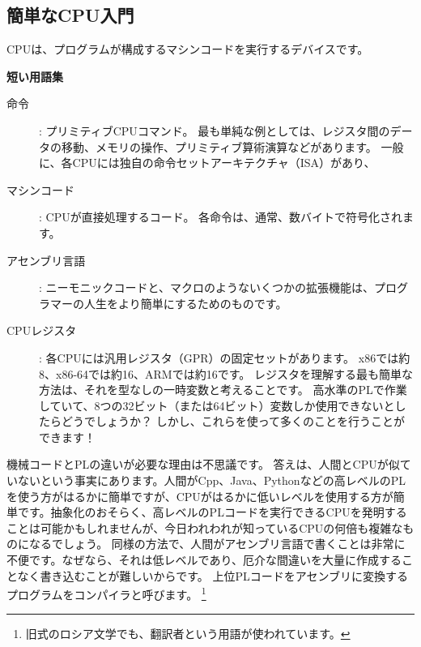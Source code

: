 \subsection{簡単なCPU入門}

\ac{CPU}は、プログラムが構成するマシンコードを実行するデバイスです。

\textbf{短い用語集}

\begin{description}
\item[命令]: プリミティブ\ac{CPU}コマンド。
最も単純な例としては、レジスタ間のデータの移動、メモリの操作、プリミティブ算術演算などがあります。 一般に、各CPUには独自の命令セットアーキテクチャ（ISA）があり、
\item[マシンコード]: CPUが直接処理するコード。 各命令は、通常、数バイトで符号化されます。
\item[アセンブリ言語]: ニーモニックコードと、マクロのようないくつかの拡張機能は、プログラマーの人生をより簡単にするためのものです。
\item[CPUレジスタ]: 各CPUには汎用レジスタ（GPR）の固定セットがあります。 x86では約8、x86-64では約16、ARMでは約16です。 レジスタを理解する最も簡単な方法は、それを型なしの一時変数と考えることです。 高水準のPLで作業していて、8つの32ビット（または64ビット）変数しか使用できないとしたらどうでしょうか？ しかし、これらを使って多くのことを行うことができます！
\end{description}


機械コードとPLの違いが必要な理由は不思議です。 答えは、人間とCPUが似ていないという事実にあります。人間がCpp、Java、Pythonなどの高レベルのPLを使う方がはるかに簡単ですが、CPUがはるかに低いレベルを使用する方が簡単です。抽象化のおそらく、高レベルのPLコードを実行できるCPUを発明することは可能かもしれませんが、今日われわれが知っているCPUの何倍も複雑なものになるでしょう。 同様の方法で、人間がアセンブリ言語で書くことは非常に不便です。なぜなら、それは低レベルであり、厄介な間違いを大量に作成することなく書き込むことが難しいからです。 上位PLコードをアセンブリに変換するプログラムをコンパイラと呼びます。
\footnote{旧式のロシア文学でも、翻訳者という用語が使われています。}

%
%
%

